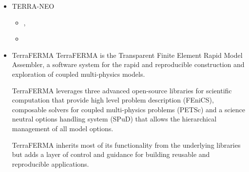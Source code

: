 \begin{itemize}
\begin{scriptsize}
\begin{itemize}
\item[\twothousandfifteen]   \textcite{amsb15},  \textcite{cobs15}
\item[\twothousandsixteen]   \textcite{vade16},  \textcite{necg16}, \textcite{pric16}
\item[\twothousandseventeen] \textcite{woda17},  \textcite{badw17}, \textcite{rubh17} 
\item[\twothousandeighteen]  \textcite{ghbu18},  \textcite{cogb18}, \textcite{prda18}
\item[\twothousandnineteen]  \textcite{prdp19}
\item[\twothousandtwentyone] \textcite{ghbo21}
\item[\twothousandtwentytwo] \textcite{licw22}
\end{itemize}
\end{scriptsize}

\item {\codefont TERRA-NEO} 

\begin{scriptsize}
\begin{itemize}
\item[\twothousandfifteen] \textcite{gmrs15}, \textcite{wegg15}
\item[\twothousandtwenty]  \textcite{babd20}
\end{itemize}
\end{scriptsize}

\item {\codefont TerraFERMA} 
TerraFERMA is the Transparent Finite Element Rapid Model Assembler, a software 
system for the rapid and reproducible construction and exploration of coupled multi-physics models.

TerraFERMA leverages three advanced open-source libraries for scientific computation that 
provide high level problem description (FEniCS), composable solvers for coupled multi-physics 
problems (PETSc) and a science neutral options handling system (SPuD) that allows the hierarchical 
management of all model options.

TerraFERMA inherits most of its functionality from the underlying libraries but adds a layer of 
control and guidance for building reusable and reproducible applications.


\end{itemize}
